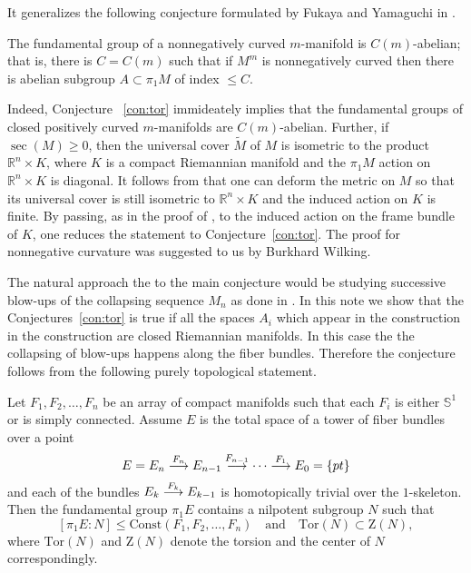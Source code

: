 \documentclass{amsart}
\begin{document}
It generalizes the following conjecture formulated by Fukaya and Yamaguchi in \cite{FY} .

\begin{conj}\label{con:c-ab}
The fundamental group of a nonnegatively curved  $m$-manifold is $C(m)$-abelian;
that is, there is $C=C(m)$ such that if $M^m$ is nonnegatively curved then there is abelian subgroup $A\subset \pi_1M$ of index $\le C$.
\end{conj}

Indeed, Conjecture ~\ref{con:tor} immideately implies that the fundamental
groups of closed positively curved $m$-manifolds are $C(m)$-abelian.
Further, if $\sec(M)\ge0$, then the universal cover $\tilde M$ of $M$ is isometric to the product $\mathbb{R}^n\times K$, where $K$ is a compact Riemannian manifold and the $\pi_1M$ action  on $\mathbb{R}^n\times K$ is diagonal.
It follows from \cite[Cor. 6.3]{wilking} that one can deform the metric on $M$ so that its universal cover is still isometric to $\mathbb{R}^n\times K$ and the induced action on $K$ is finite.
By passing, as in the proof of \cite[Corollary 4.6.1]{KPT}, to the induced action on the frame bundle of $K$, one reduces the statement to Conjecture~\ref{con:tor}.
The proof for nonnegative curvature was suggested to us by Burkhard Wilking.

The natural approach the to the main conjecture would be studying successive blow-ups of the
collapsing sequence $M_n$ as done in \cite[Section 4.3]{KPT}.
In this note we show that the Conjectures~\ref{con:tor} is true if all the spaces $A_i$ which appear in the construction in the construction are closed Riemannian manifolds.
In this case the the collapsing of blow-ups happens along the fiber bundles.
Therefore the conjecture follows from the following purely topological statement.

\begin{thm}\label{thm:smooth}
Let $F_1,F_2,\dots,F_n$ be an array of compact manifolds 
such that each $F_i$ is either $\mathbb{S}^{1}$ or is simply connected. 
Assume $E$ is the total space of a tower of fiber bundles over a point
$$E=E_n\buildrel {F_n}\over \longrightarrow E_{n-1}\buildrel {F_{n-1}}\over\longrightarrow\dots\buildrel {F_1}\over\longrightarrow E_0=\{pt\}$$
and each of the bundles $E_k\buildrel {F_k}\over \longrightarrow E_{k-1}$ is homotopically trivial over the $1$-skeleton. 
Then the fundamental group $\pi_1E$ contains a nilpotent subgroup $N$ such that
$$[\pi_1E:N]\le \mathrm{Const}(F_1,F_2,\dots,F_n)\quad\text{and}\quad\mathrm{Tor}(N)\subset \mathrm{Z}(N),$$
where $\mathrm{Tor}(N)$ and $\mathrm{Z}(N)$ denote the torsion and the center of $N$ correspondingly.
\end{thm}
\end{document}
